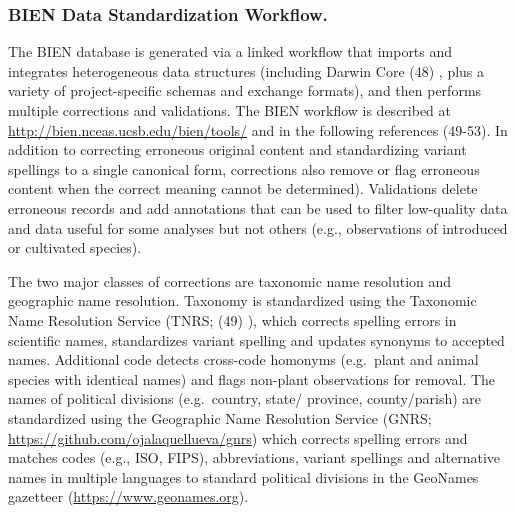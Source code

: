 \documentclass[]{article}
\begin{document}
\hypertarget{bien-data-standardization-workflow.}{%
\subsubsection{BIEN Data Standardization Workflow.}\label{bien-data-standardization-workflow.}}

The BIEN database is generated via a linked workflow that imports and integrates heterogeneous data structures (including Darwin Core (48) , plus a variety of project-specific schemas and exchange formats), and then performs multiple corrections and validations. The BIEN workflow is described at \url{http://bien.nceas.ucsb.edu/bien/tools/} and in the following references (49-53). In addition to correcting erroneous original content and standardizing variant spellings to a single canonical form, corrections also remove or flag erroneous content when the correct meaning cannot be determined). Validations delete erroneous records and add annotations that can be used to filter low-quality data and data useful for some analyses but not others (e.g., observations of introduced or cultivated species).

The two major classes of corrections are taxonomic name resolution and geographic name resolution. Taxonomy is standardized using the Taxonomic Name Resolution Service (TNRS; (49) ), which corrects spelling errors in scientific names, standardizes variant spelling and updates synonyms to accepted names. Additional code detects cross-code homonyms (e.g.~plant and animal species with identical names) and flags non-plant observations for removal. The names of political divisions (e.g.~country, state/ province, county/parish) are standardized using the Geographic Name Resolution Service (GNRS; \url{https://github.com/ojalaquellueva/gnrs}) which corrects spelling errors and matches codes (e.g., ISO, FIPS), abbreviations, variant spellings and alternative names in multiple languages to standard political divisions in the GeoNames gazetteer (\url{https://www.geonames.org}).
\end{document}
